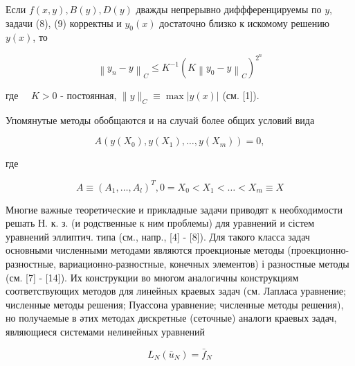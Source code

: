 \documentclass[10pt]{article}
\begin{document}
Если $f(x, y), B(y), D(y)$ дважды непрерывно диффференцируемы по $y$, задачи (8), (9) корректны и $y_{0}(x)$ достаточно близко к искомому решению $y(x)$, то



\[

\left\|y_{n}-y\right\|_{C} \leqslant K^{-1}\left(K\left\|y_{0}-y\right\|_{C}\right)^{2^{n}}

\]



где $\quad K>0$ - постоянная, $\|y\|_{C} \equiv \max |y(x)|$ (см. [1]).



Упомянутые методы обобщаются и на случай более общих условий вида



\[

A\left(y\left(X_{0}\right), y\left(X_{1}\right), \ldots, y\left(X_{m}\right)\right)=0,

\]



где



\[

A \equiv\left(A_{1}, \ldots, A_{l}\right)^{T}, 0=X_{0}<X_{1}<\ldots<X_{m} \equiv X

\]



Многие важные теоретические и прикладные задачи приводят к необходимости решать Н. к. з. (и родственные к ним проблемы) для уравнений и сістем уравнений эллиптич. типа (см., напр., [4] - [8]). Для такого класса задач основными численными методами являются проекционые методы (проекционно-разностные, вариационно-разностные, конечных элементов) і разностные методы (см. [7] - [14]). Их конструкции во многом аналогичны конструкциям соответствующих методов для линейных краевых задач (см. Лапласа уравнение; численные методы решения; Пуассона уравнение; численные методы решения), но получаемые в әтих методах дискретные (сеточные) аналоги краевых задач, являющиеся системами нелинейных уравнений



\[

L_{N}\left(\bar{u}_{N}\right)=\bar{f}_{N}

\]
\end{document}
